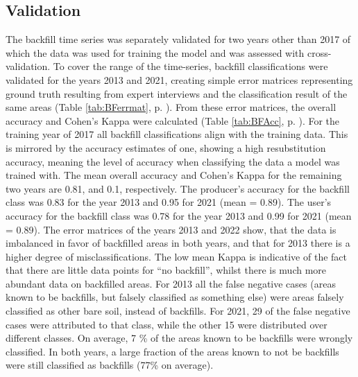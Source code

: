 \documentclass[11pt, A4, oneside]{report}
\begin{document}
\subsection{Validation}
The backfill time series was separately validated for two years other than 2017 of which the data was used for training the model and was assessed with cross-validation. To cover the range of the time-series, backfill classifications were validated for the years 2013 and 2021, creating simple error matrices representing ground truth resulting from expert interviews and the classification result of the same areas (Table \ref{tab:BFerrmat}, p. \pageref{tab:BFerrmat}). From these error matrices, the overall accuracy and Cohen's Kappa were calculated (Table \ref{tab:BFAcc}, p. \pageref{tab:BFAcc}).
For the training year of 2017 all backfill classifications align with the training data. This is mirrored by the accuracy estimates of one,  showing a high resubstitution accuracy, meaning the level of accuracy when classifying the data a model was trained with.
The mean overall accuracy and Cohen's Kappa for the remaining two years are 0.81, and 0.1, respectively. The producer's accuracy for the backfill class was 0.83 for the year 2013 and 0.95 for 2021 (mean = 0.89). The user's accuracy for the backfill class was 0.78 for the year 2013 and 0.99 for 2021 (mean = 0.89).
The error matrices of the years 2013 and 2022 show, that the data is imbalanced in favor of backfilled areas in both years, and that for 2013 there is a higher degree of misclassifications. The low mean Kappa is indicative of the fact that there are little data points for ``no backfill'', whilst there is much more abundant data on backfilled areas. For 2013 all the false negative cases (areas known to be backfills, but falsely classified as something else) were areas falsely classified as other bare soil, instead of backfills. For 2021, 29 of the false negative cases were attributed to that class, while the other 15 were distributed over different classes. On average, 7 \% of the areas known to be backfills were wrongly classified. In both years, a large fraction of the areas known to not be backfills were still classified as backfills (77\% on average).
\end{document}
